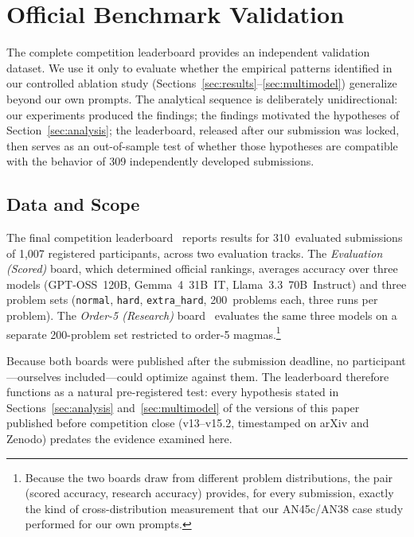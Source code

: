 
\section{Official Benchmark Validation}
\label{sec:official}

The complete competition leaderboard provides an independent validation
dataset. We use it only to evaluate whether the empirical patterns
identified in our controlled ablation study
(Sections~\ref{sec:results}--\ref{sec:multimodel}) generalize beyond our
own prompts. The analytical sequence is deliberately unidirectional: our
experiments produced the findings; the findings motivated the hypotheses
of Section~\ref{sec:analysis}; the leaderboard, released after our
submission was locked, then serves as an out-of-sample test of whether
those hypotheses are compatible with the behavior of 309 independently
developed submissions.

\subsection{Data and Scope}
\label{sec:official-data}

The final competition leaderboard~\citep{sair2026leaderboard} reports
results for 310~evaluated submissions of 1{,}007 registered participants,
across two evaluation tracks. The \emph{Evaluation (Scored)} board, which
determined official rankings, averages accuracy over three models
(GPT-OSS~120B, Gemma~4~31B~IT, Llama~3.3~70B~Instruct) and three problem
sets (\texttt{normal}, \texttt{hard}, \texttt{extra\_hard}, 200~problems
each, three runs per problem). The \emph{Order-5 (Research)}
board~\citep{sair2026leaderboardresearch} evaluates the same three models
on a separate 200-problem set restricted to order-5
magmas.\footnote{Because the two boards draw from different problem
distributions, the pair (scored accuracy, research accuracy) provides,
for every submission, exactly the kind of cross-distribution measurement
that our AN45c/AN38 case study performed for our own prompts.}

Because both boards were published after the submission deadline, no
participant---ourselves included---could optimize against them. The
leaderboard therefore functions as a natural pre-registered test: every
hypothesis stated in Sections~\ref{sec:analysis}
and~\ref{sec:multimodel} of the versions of this paper published before
competition close (v13--v15.2, timestamped on arXiv and Zenodo) predates
the evidence examined here.

